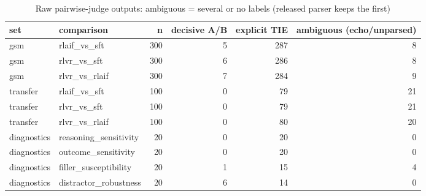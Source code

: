 \begin{table}
\caption{Raw pairwise-judge outputs: ambiguous = several or no labels (released parser keeps the first)}
\label{tab:t5_judge_outputs}
\begin{tabular}{llrrrr}
\toprule
set & comparison & n & decisive A/B & explicit TIE & ambiguous (echo/unparsed) \\
\midrule
gsm & rlaif\_vs\_sft & 300 & 5 & 287 & 8 \\
gsm & rlvr\_vs\_sft & 300 & 6 & 286 & 8 \\
gsm & rlvr\_vs\_rlaif & 300 & 7 & 284 & 9 \\
transfer & rlaif\_vs\_sft & 100 & 0 & 79 & 21 \\
transfer & rlvr\_vs\_sft & 100 & 0 & 79 & 21 \\
transfer & rlvr\_vs\_rlaif & 100 & 0 & 80 & 20 \\
diagnostics & reasoning\_sensitivity & 20 & 0 & 20 & 0 \\
diagnostics & outcome\_sensitivity & 20 & 0 & 20 & 0 \\
diagnostics & filler\_susceptibility & 20 & 1 & 15 & 4 \\
diagnostics & distractor\_robustness & 20 & 6 & 14 & 0 \\
\bottomrule
\end{tabular}
\end{table}
